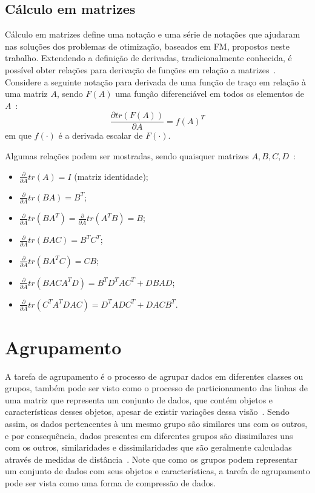 \documentclass[
    12pt,                %
    oneside,            %
    a4paper,            %
    english,            %
    brazil                %
    ]{abntex2ppgsi}
\begin{document}
\subsection{Cálculo em matrizes}
\label{subsec:matrixcalculus}

Cálculo em matrizes define uma notação e uma série de notações que ajudaram nas soluções dos problemas de otimização, baseados em FM, propostos neste trabalho.
Extendendo a definição de derivadas, tradicionalmente conhecida, é possível obter relações para derivação de funções em relação a matrizes~\cite{Magnus1999}.
Considere a seguinte notação para derivada de uma função de traço em relação à uma matriz $A$, sendo $F(A)$ uma função diferenciável em todos os elementos de $A$~\cite{Petersen2012}:
\[
    \frac{\partial tr(F(A))}{\partial A} = f(A)^T
\]
em que $f(\cdot)$ é a derivada escalar de $F(\cdot)$.

Algumas relações podem ser mostradas, sendo quaisquer matrizes $A, B, C, D$~\cite{Petersen2012}:
\begin{itemize}
    \item $\frac{\partial}{\partial A} tr(A) = I$ (matriz identidade);
    \item $\frac{\partial}{\partial A} tr(B A) = B^T$;
    \item $\frac{\partial}{\partial A} tr(B A^T) = \frac{\partial}{\partial A} tr(A^T B) = B$;
    \item $\frac{\partial}{\partial A} tr(B A C) = B^T C^T$;
    \item $\frac{\partial}{\partial A} tr(B A^T C) = CB$;
    \item $\frac{\partial}{\partial A} tr(B A C A^T D) = B^T D^T A C^T + D B A D$;
    \item $\frac{\partial}{\partial A} tr(C^T A^T D A C) = D^T A D C^T + D A C B^T$.
\end{itemize}

\section{Agrupamento}
\label{sec:clustering}

A tarefa de agrupamento é o processo de agrupar dados em diferentes classes ou grupos, também pode ser visto como o processo de particionamento das linhas de uma matriz que representa um conjunto de dados, que contém objetos e características desses objetos, apesar de existir variações dessa visão~\cite{Han2011}.
Sendo assim, os dados pertencentes à um mesmo grupo são similares uns com os outros, e por consequência, dados presentes em diferentes grupos são dissimilares uns com os outros, similaridades e dissimilaridades que são geralmente calculadas através de medidas de distância~\cite{Han2011}.
Note que como os grupos podem representar um conjunto de dados com seus objetos e características, a tarefa de agrupamento pode ser vista como uma forma de compressão de dados.
\end{document}
